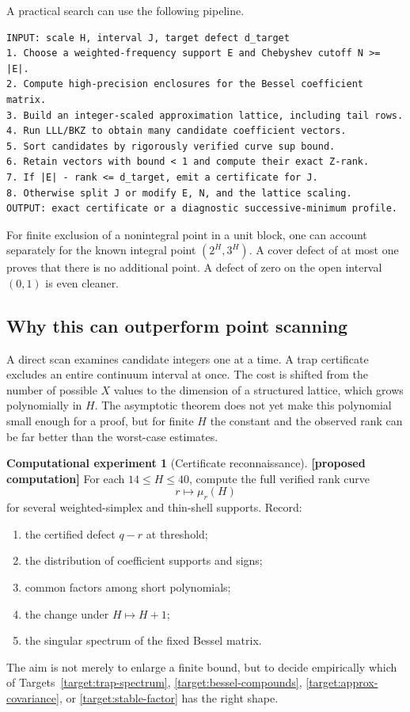 \documentclass[11pt,oneside]{article}
\theoremstyle{definition}
\newtheorem{experiment}[theorem]{Computational experiment}
\theoremstyle{remark}
\newcommand{\statuscompute}{\textcolor{computeviolet}{\textbf{[proposed computation]}}}
\begin{document}
A practical search can use the following pipeline.

\begin{lstlisting}[style=pseudocode]
INPUT: scale H, interval J, target defect d_target
1. Choose a weighted-frequency support E and Chebyshev cutoff N >= |E|.
2. Compute high-precision enclosures for the Bessel coefficient matrix.
3. Build an integer-scaled approximation lattice, including tail rows.
4. Run LLL/BKZ to obtain many candidate coefficient vectors.
5. Sort candidates by rigorously verified curve sup bound.
6. Retain vectors with bound < 1 and compute their exact Z-rank.
7. If |E| - rank <= d_target, emit a certificate for J.
8. Otherwise split J or modify E, N, and the lattice scaling.
OUTPUT: exact certificate or a diagnostic successive-minimum profile.
\end{lstlisting}

For finite exclusion of a nonintegral point in a unit block, one can account separately for
the known integral point $(2^H,3^H)$.  A cover defect of at most one proves that there is no
additional point.  A defect of zero on the open interval $(0,1)$ is even cleaner.

\subsection{Why this can outperform point scanning}

A direct scan examines candidate integers one at a time.  A trap certificate excludes an
entire continuum interval at once.  The cost is shifted from the number of possible $X$ values
to the dimension of a structured lattice, which grows polynomially in $H$.  The asymptotic
theorem does not yet make this polynomial small enough for a proof, but for finite $H$ the
constant and the observed rank can be far better than the worst-case estimates.

\begin{experiment}[Certificate reconnaissance]
\label{exp:recon}
\statuscompute\quad
For each $14\le H\le40$, compute the full verified rank curve
\[
 r\longmapsto\mu_r(H)
\]
for several weighted-simplex and thin-shell supports.  Record:
\begin{enumerate}
\item the certified defect $q-r$ at threshold;
\item the distribution of coefficient supports and signs;
\item common factors among short polynomials;
\item the change under $H\mapsto H+1$;
\item the singular spectrum of the fixed Bessel matrix.
\end{enumerate}
The aim is not merely to enlarge a finite bound, but to decide empirically which of
Targets~\ref{target:trap-spectrum}, \ref{target:bessel-compounds},
\ref{target:approx-covariance}, or \ref{target:stable-factor} has the right shape.
\end{experiment}
\end{document}
